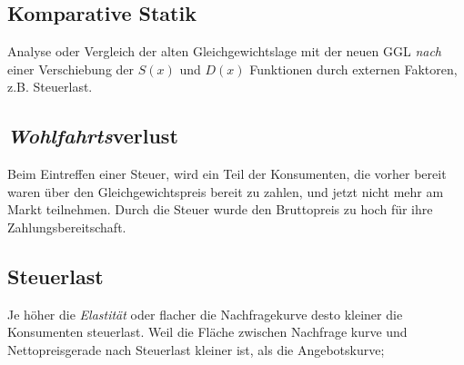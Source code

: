\subsection{Komparative Statik}
Analyse oder Vergleich der alten Gleichgewichtslage mit der neuen GGL \textit{nach} einer Verschiebung der $S(x)$ und $D(x)$ Funktionen durch externen Faktoren, z.B. Steuerlast.

\subsection{\textit{Wohlfahrts}verlust}
Beim Eintreffen einer Steuer, wird ein Teil der Konsumenten, die vorher bereit waren über den Gleichgewichtspreis bereit zu zahlen, und jetzt nicht mehr am Markt teilnehmen. Durch die Steuer wurde den Bruttopreis zu hoch für ihre Zahlungsbereitschaft.
\subsection{Steuerlast}
Je höher die \textit{Elastität} oder flacher die Nachfragekurve desto kleiner die Konsumenten steuerlast. Weil die Fläche zwischen Nachfrage kurve und Nettopreisgerade nach Steuerlast kleiner ist, als die Angebotskurve;

